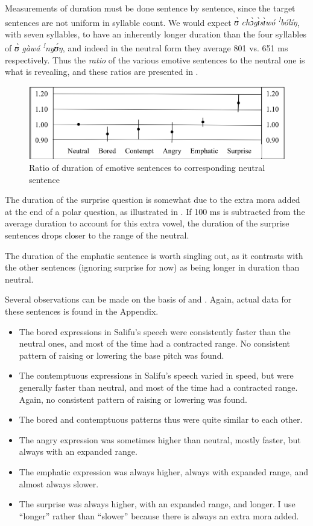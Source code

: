 \documentclass[output=paper]{langsci/langscibook}
\begin{document}
Measurements of duration must be done sentence by sentence, since the target sentences are not uniform in syllable count. We would expect \textit{ʊ̀ chɔ̀gɪ̀sɪ̀wó \textsuperscript{!}bólíŋ}, with seven syllables, to have an inherently longer duration than the four syllables of \textit{ʊ̀ gàwá  \textsuperscript{!}nyʊ́ŋ}, and indeed in the neutral form they average 801 vs. 651 ms respectively. Thus the \emph{ratio} of the various emotive sentences to the neutral one is what is revealing, and these ratios are presented in . 

\begin{figure}[h]
\includegraphics[width=\textwidth]{figures/cahillfig3}
\caption{Ratio of duration of emotive sentences to corresponding neutral sentence}
\label{fig:3.cahill}
\end{figure}

The duration of the surprise question is somewhat due to the extra mora added at the end of a polar question, as illustrated in . If 100 ms is subtracted from the average duration to account for this extra vowel, the duration of the surprise sentences drops closer to the range of the neutral. 

The duration of the emphatic sentence is worth singling out, as it contrasts with the other sentences (ignoring surprise for now) as being longer in duration than neutral. 

Several observations can be made on the basis of  and . Again, actual data for these sentences is found in the Appendix.

\begin{itemize}
\item The bored expressions in Salifu's speech were consistently faster than the neutral ones, and most of the time had a contracted range. No consistent pattern of raising or lowering the base pitch was found.
\item The contemptuous expressions in Salifu's speech varied in speed, but were generally faster than neutral, and most of the time had a contracted range. Again, no consistent pattern of raising or lowering was found.
\item The bored and contemptuous patterns thus were quite similar to each other.
\item The angry expression was sometimes higher than neutral, mostly faster, but always with an expanded range.
\item The emphatic expression was always higher, always with expanded range, and almost always slower.
\item The surprise was always higher, with an expanded range, and longer. I use ``longer'' rather than ``slower'' because there is always an extra mora added.
\end{itemize}
\end{document}
